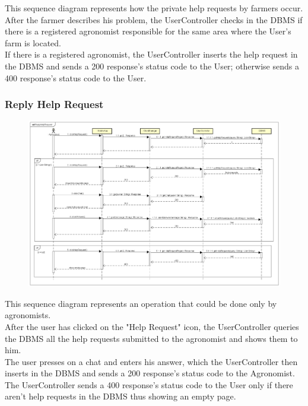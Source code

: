 This sequence diagram represents how the private help requests by farmers occur.\\
After the farmer describes his problem, the UserController checks in the DBMS if there 
is a registered agronomist responsible for the same area where the User's farm is located.\\
If there is a registered agronomist, the UserController inserts the help request in the DBMS and sends 
a 200 response's status code to the User; otherwise sends a 400 response's status code to the User.


\newpage
\subsubsection{Reply Help Request}

\begin{figure}[H]
    \begin{center}
        \includegraphics[width=\textwidth]{Images/SequenceDiagrams/ReplyHelpRequestDD.png}
    \end{center}
\end{figure}

This sequence diagram represents an operation that could be done only by agronomists.\\
After the user has clicked on the "Help Request" icon, the UserController queries the DBMS 
all the help requests submitted to the agronomist and shows them to him.\\
The user presses on a chat and enters his answer, which the UserController then inserts 
in the DBMS and sends a 200 response's status code to the Agronomist.\\
The UserController sends a 400 response's status code to the User only 
if there aren't help requests in the DBMS thus showing an empty page.


